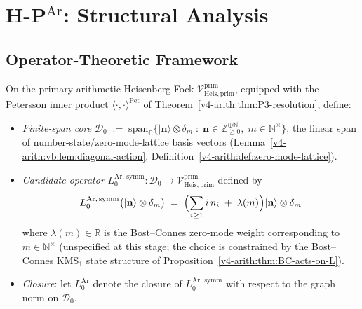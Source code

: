\section{H-P\(^{\mathrm{Ar}}\): Structural Analysis}
\label{v4-arith:hpvbconv:HPAr-analysis}

\subsection{Operator-Theoretic Framework}
\label{v4-arith:hpvbconv:operator-framework}

\begin{definition}
\label{v4-arith:hpvbconv:def:L0-domain}
On the primary arithmetic Heisenberg Fock
\(\mathcal{V}^{\mathrm{prim}}_{\mathrm{Heis},\mathrm{prim}}\), equipped
with the Petersson inner product \(\langle\cdot,\cdot\rangle^{\mathrm{Pet}}\)
of Theorem~\ref{v4-arith:thm:P3-resolution}, define:
\begin{itemize}
\item \emph{Finite-span core}
\(\mathcal{D}_{0}\;:=\;\mathrm{span}_{\mathbb{C}}\{|\mathbf{n}\rangle\otimes\delta_{m}\;:\;\mathbf{n}\in\mathbb{Z}_{\geq
0}^{\oplus\mathbb{N}},\;m\in\mathbb{N}^{\times}\}\),
the linear span of number-state/zero-mode-lattice basis vectors
(Lemma~\ref{v4-arith:vb:lem:diagonal-action},
Definition~\ref{v4-arith:def:zero-mode-lattice}).
\item \emph{Candidate operator}
\(L_{0}^{\mathrm{Ar},\,\mathrm{symm}}:\mathcal{D}_{0}\to\mathcal{V}^{\mathrm{prim}}_{\mathrm{Heis},\mathrm{prim}}\)
defined by
\begin{equation}
\label{v4-arith:hpvbconv:eq:L0-def}
L_{0}^{\mathrm{Ar},\,\mathrm{symm}}\bigl(|\mathbf{n}\rangle\otimes\delta_{m}\bigr)\;=\;\Bigl(\sum_{i\geq
1}i\,n_{i}\;+\;\lambda(m)\Bigr)|\mathbf{n}\rangle\otimes\delta_{m}
\end{equation}
where \(\lambda(m)\in\mathbb{R}\) is the Bost--Connes zero-mode weight
corresponding to \(m\in\mathbb{N}^{\times}\) (unspecified at this stage;
the choice is constrained by the Bost--Connes KMS\({}_{1}\) state
structure of Proposition~\ref{v4-arith:thm:BC-acts-on-L}).
\item \emph{Closure}: let \(L_{0}^{\mathrm{Ar}}\) denote the closure of
\(L_{0}^{\mathrm{Ar},\,\mathrm{symm}}\) with respect to the graph norm
on \(\mathcal{D}_{0}\).
\end{itemize}
\end{definition}

